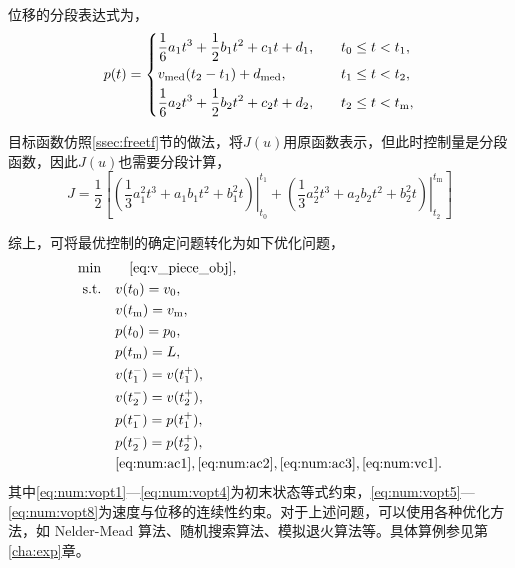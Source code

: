 位移的分段表达式为，
\begin{equation}
p(t)=
\begin{dcases}
\frac16 a_1t^3+\frac12b_1t^2+c_1t+d_1,\quad& t_0\leq t < t_1,\\
v_\mathrm{med}(t_2-t_1)+d_\mathrm{med}, \quad& t_1\leq t < t_2,\\
\frac16 a_2t^3+\frac12b_2t^2+c_2t+d_2,\quad& t_2\leq t < t_\mathrm{m},
\end{dcases}
\end{equation}

目标函数仿照\ref{ssec:freetf}节的做法，将$J(u)$用原函数表示，但此时控制量是分段函数，因此$J(u)$也需要分段计算，
\begin{equation}
J=\frac12\left[\left.\left(\frac13a_1^2t^3+a_1b_1t^2+b_1^2t\right)\right|_{t_0}^{t_1}+\left.\left(\frac13a_2^2t^3+a_2b_2t^2+b_2^2t\right)\right|_{t_2}^{t_\mathrm{m}}\right]
\label{eq:v_piece_obj}
\end{equation}

综上，可将最优控制的确定问题转化为如下优化问题，
\begin{align}
\min\quad& \quad\eqref{eq:v_piece_obj},\label{eq:num:vopt0}\\
\text{s.t.}
\quad & v(t_0)=v_0,\label{eq:num:vopt1}\\
\quad & v(t_\mathrm{m})=v_\mathrm{m},\\
\quad & p(t_0)=p_0,\\
\quad & p(t_\mathrm{m})=L,\label{eq:num:vopt4}\\
\quad & v(t_1^-)=v(t_1^+),\label{eq:num:vopt5}\\
\quad & v(t_2^-)=v(t_2^+),\\
\quad & p(t_1^-)=p(t_1^+),\\
\quad & p(t_2^-)=p(t_2^+),\label{eq:num:vopt8}\\
\quad & \eqref{eq:num:ac1},\eqref{eq:num:ac2},\eqref{eq:num:ac3},\eqref{eq:num:vc1}.\label{eq:num:vopt9}
\end{align}
其中\eqref{eq:num:vopt1}---\eqref{eq:num:vopt4}为初末状态等式约束，\eqref{eq:num:vopt5}---\eqref{eq:num:vopt8}为速度与位移的连续性约束。对于上述问题，可以使用各种优化方法，如 Nelder-Mead 算法、随机搜索算法、模拟退火算法等。具体算例参见第\ref{cha:exp}章。

